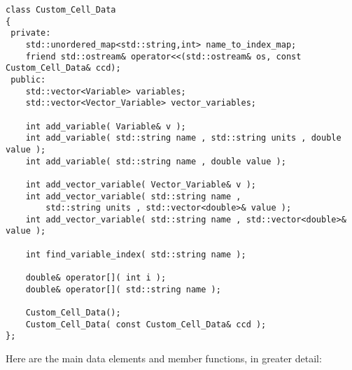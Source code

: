 \documentclass[12pt]{article}
\begin{document}
\begin{verbatim}
class Custom_Cell_Data
{
 private:
    std::unordered_map<std::string,int> name_to_index_map; 
    friend std::ostream& operator<<(std::ostream& os, const Custom_Cell_Data& ccd);   
 public:
    std::vector<Variable> variables; 
    std::vector<Vector_Variable> vector_variables; 
    
    int add_variable( Variable& v );   
    int add_variable( std::string name , std::string units , double value );   
    int add_variable( std::string name , double value );   

    int add_vector_variable( Vector_Variable& v );   
    int add_vector_variable( std::string name , 
        std::string units , std::vector<double>& value );   
    int add_vector_variable( std::string name , std::vector<double>& value );   

    int find_variable_index( std::string name );   

    double& operator[]( int i );  
    double& operator[]( std::string name );   
    
    Custom_Cell_Data();   
    Custom_Cell_Data( const Custom_Cell_Data& ccd ); 
};
\end{verbatim}

Here are the main data elements and member functions, in 
greater detail: 
\end{document}
